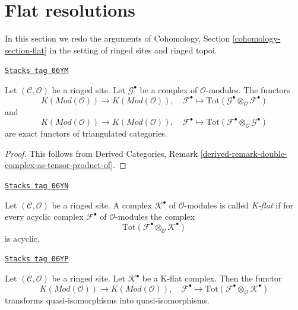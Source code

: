 \section{Flat resolutions}
\label{sites-cohomology-section-flat}
In this section we redo the arguments of
Cohomology, Section \ref{cohomology-section-flat}
in the setting of ringed sites and ringed topoi.

\begin{lemma}
\label{sites-cohomology-lemma-derived-tor-exact}
\href{https://stacks.math.columbia.edu/tag/06YM}{\texttt{Stacks tag 06YM}}

Let $(\mathcal{C}, \mathcal{O})$ be a ringed site.
Let $\mathcal{G}^\bullet$ be a complex of $\mathcal{O}$-modules.
The functors
$$
K(\textit{Mod}(\mathcal{O}))
\longrightarrow
K(\textit{Mod}(\mathcal{O})),
\quad
\mathcal{F}^\bullet \longmapsto
\text{Tot}(\mathcal{G}^\bullet \otimes_\mathcal{O} \mathcal{F}^\bullet)
$$
and
$$
K(\textit{Mod}(\mathcal{O}))
\longrightarrow
K(\textit{Mod}(\mathcal{O})),
\quad
\mathcal{F}^\bullet \longmapsto
\text{Tot}(\mathcal{F}^\bullet \otimes_\mathcal{O} \mathcal{G}^\bullet)
$$
are exact functors of triangulated categories.
\end{lemma}

\begin{proof}
This follows from Derived Categories, Remark
\ref{derived-remark-double-complex-as-tensor-product-of}.
\end{proof}

\begin{definition}[K flat]
\label{sites-cohomology-definition-K-flat}
\href{https://stacks.math.columbia.edu/tag/06YN}{\texttt{Stacks tag 06YN}}

Let $(\mathcal{C}, \mathcal{O})$ be a ringed site.
A complex $\mathcal{K}^\bullet$ of $\mathcal{O}$-modules is
called {\it K-flat} if for every acyclic complex $\mathcal{F}^\bullet$
of $\mathcal{O}$-modules the complex
$$
\text{Tot}(\mathcal{F}^\bullet \otimes_\mathcal{O} \mathcal{K}^\bullet)
$$
is acyclic.
\end{definition}

\begin{lemma}
\label{sites-cohomology-lemma-K-flat-quasi-isomorphism}
\href{https://stacks.math.columbia.edu/tag/06YP}{\texttt{Stacks tag 06YP}}

Let $(\mathcal{C}, \mathcal{O})$ be a ringed site.
Let $\mathcal{K}^\bullet$ be a K-flat complex.
Then the functor
$$
K(\textit{Mod}(\mathcal{O}))
\longrightarrow
K(\textit{Mod}(\mathcal{O})), \quad
\mathcal{F}^\bullet
\longmapsto
\text{Tot}(\mathcal{F}^\bullet \otimes_\mathcal{O} \mathcal{K}^\bullet)
$$
transforms quasi-isomorphisms into quasi-isomorphisms.
\end{lemma}

